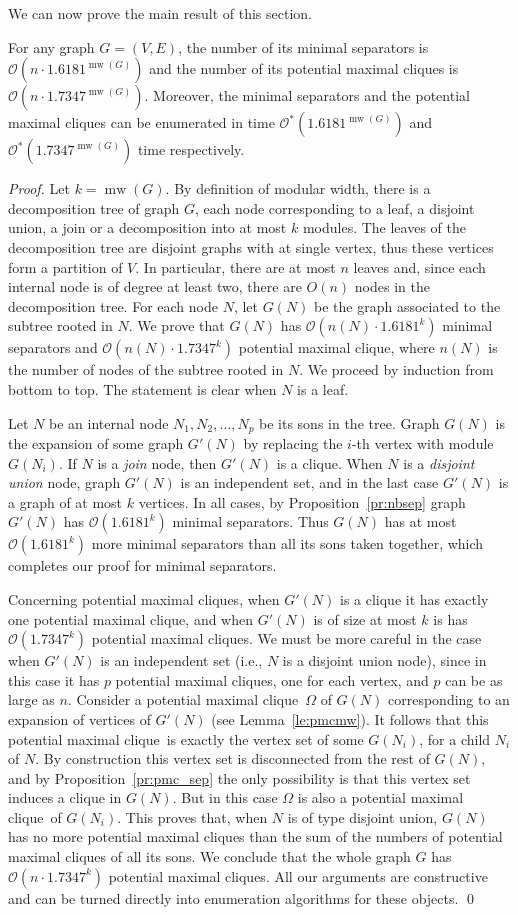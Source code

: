 \documentclass{llncs}
\newcommand{\cO}{\mathcal{O}}
\newcommand{\mw}{\operatorname{mw}}
\newcommand{\pmc}{potential maximal clique}
\newcommand{\goldratio}{1.6181}
\newcommand{\pmcb}{1.7347}
\begin{document}
We can now prove the main result of this section.
\begin{theorem}\label{th:sepmw}\label{th:pmcmw}
For any graph $G=(V,E)$, the number of its minimal separators is $\cO(n \cdot \goldratio^{\mw(G)})$ and the number of its potential maximal cliques is $\cO(n \cdot \pmcb^{\mw(G)})$. Moreover, the minimal separators and the potential maximal cliques can be enumerated in time $\cO^*(\goldratio^{\mw(G)})$ and $\cO^*(\pmcb^{\mw(G)})$ time respectively.
\end{theorem}
\begin{proof}
Let $k = \mw(G)$. By definition of modular width, there is a decomposition tree of graph $G$, each node corresponding to a leaf, a disjoint union, a join or a decomposition into at most $k$ modules. The leaves of the decomposition tree are disjoint graphs with at single vertex, thus these vertices form a partition of $V$. In particular, there are at most $n$ leaves and, since each internal node is of degree at least two, there are $O(n)$ nodes in the decomposition tree. For each node $N$, let $G(N)$ be the graph associated to the subtree rooted in $N$. We prove that  $G(N)$ has $\cO(n(N) \cdot  \goldratio^k)$ minimal separators and $\cO(n(N) \cdot \pmcb^k)$ \pmc, where $n(N)$ is the number of nodes of the subtree rooted in $N$. We proceed by induction from bottom to top. The statement is clear when $N$ is a leaf.

Let $N$ be an internal node $N_1, N_2, \dots, N_p$ be its sons in the tree. 
Graph $G(N)$ is the expansion of some graph $G'(N)$ by replacing the $i$-th vertex with module $G(N_i)$. If $N$ is a \emph{join} node, then $G'(N)$ is a clique. When $N$ is a \emph{disjoint union} node, graph $G'(N)$ is an independent set, and in the last case $G'(N)$ is a graph of at most $k$ vertices. In all cases, by Proposition~\ref{pr:nbsep} graph $G'(N)$ has  $\cO(\goldratio^k)$ minimal separators. Thus $G(N)$ has at most $\cO(\goldratio^k)$ more minimal separators than all its sons taken together, which completes our proof for minimal separators. 

Concerning potential maximal cliques, when $G'(N)$ is a clique it has exactly one potential maximal clique, and when $G'(N)$ is of size at most $k$ is has $\cO(\pmcb^k)$ \pmc s. We must be more careful in the case when $G'(N)$ is an independent set (i.e., $N$ is a disjoint union node), since in this case it has $p$ \pmc s, one for each vertex, and $p$ can be as large as $n$. Consider a \pmc\ $\Omega$ of $G(N)$ corresponding to an expansion of vertices of $G'(N)$ (see Lemma~\ref{le:pmcmw}).  It follows that this \pmc\ is exactly the vertex set of some $G(N_i)$, for a child $N_i$ of $N$. By construction this vertex set is disconnected from the rest of $G(N)$, and by Proposition~\ref{pr:pmc_sep} the only possibility is that this vertex set induces a clique in $G(N)$. But in this case $\Omega$ is also a \pmc\ of $G(N_i)$. This proves that, when $N$ is of type disjoint union, $G(N)$ has no more \pmc s than the sum of the numbers of \pmc s of all its sons. We conclude that the whole graph $G$ has  $\cO(n \cdot \pmcb^k)$ \pmc s. All our arguments are constructive and can be turned directly into enumeration algorithms for these objects.
\qed
\end{proof}
\end{document}
